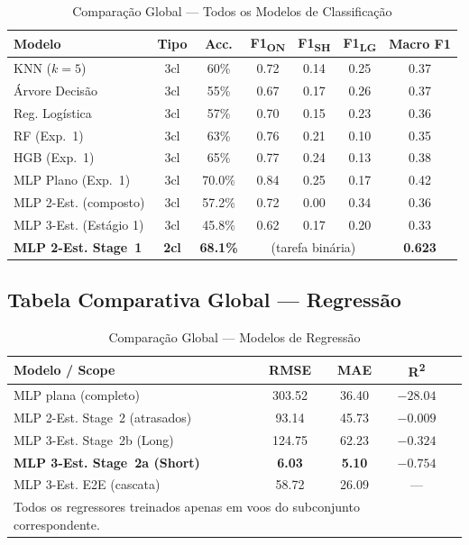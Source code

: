 \documentclass[conference]{IEEEtran}
\begin{document}
\begin{table}[h]
\centering
\caption{Comparação Global — Todos os Modelos de Classificação}
\label{tab:global}
\setlength{\tabcolsep}{2pt}
\begin{tabular}{p{2.5cm}cccccc}
\toprule
\textbf{Modelo} & \textbf{Tipo} & \textbf{Acc.} & \textbf{F1\textsubscript{ON}} & \textbf{F1\textsubscript{SH}} & \textbf{F1\textsubscript{LG}} & \textbf{Macro F1} \\
\midrule
KNN ($k=5$)              & 3cl & 60\%   & 0.72 & 0.14 & 0.25 & 0.37 \\
Árvore Decisão           & 3cl & 55\%   & 0.67 & 0.17 & 0.26 & 0.37 \\
Reg. Logística           & 3cl & 57\%   & 0.70 & 0.15 & 0.23 & 0.36 \\
RF (Exp.~1)              & 3cl & 63\%   & 0.76 & 0.21 & 0.10 & 0.35 \\
HGB (Exp.~1)             & 3cl & 65\%   & 0.77 & 0.24 & 0.13 & 0.38 \\
MLP Plano (Exp.~1)       & 3cl & 70.0\% & 0.84 & 0.25 & 0.17 & 0.42 \\
MLP 2-Est. (composto)    & 3cl & 57.2\% & 0.72 & 0.00 & 0.34 & 0.36 \\
MLP 3-Est. (Estágio 1)   & 3cl & 45.8\% & 0.62 & 0.17 & 0.20 & 0.33 \\
\midrule
\textbf{MLP 2-Est. Stage~1} & \textbf{2cl} & \textbf{68.1\%} & \multicolumn{3}{c}{(tarefa binária)} & \textbf{0.623} \\
\bottomrule
\end{tabular}
\end{table}

\subsection{Tabela Comparativa Global — Regressão}

\begin{table}[h]
\centering
\caption{Comparação Global — Modelos de Regressão}
\label{tab:global_reg}
\setlength{\tabcolsep}{3pt}
\begin{tabular}{p{2.5cm}cccc}
\toprule
\textbf{Modelo / Scope} & \textbf{RMSE} & \textbf{MAE} & \textbf{R\textsuperscript{2}} \\
\midrule
MLP plana (completo)            & 303.52 & 36.40 & $-28.04$ \\
MLP 2-Est. Stage~2 (atrasados)  & 93.14  & 45.73 & $-0.009$ \\
MLP 3-Est. Stage~2b (Long)      & 124.75 & 62.23 & $-0.324$ \\
\textbf{MLP 3-Est. Stage~2a (Short)}  & \textbf{6.03} & \textbf{5.10} & $-0.754$ \\
MLP 3-Est. E2E (cascata)        & 58.72  & 26.09 & — \\
\bottomrule
\multicolumn{4}{l}{\small Todos os regressores treinados apenas em voos do subconjunto correspondente.}\\
\end{tabular}
\end{table}
\end{document}
